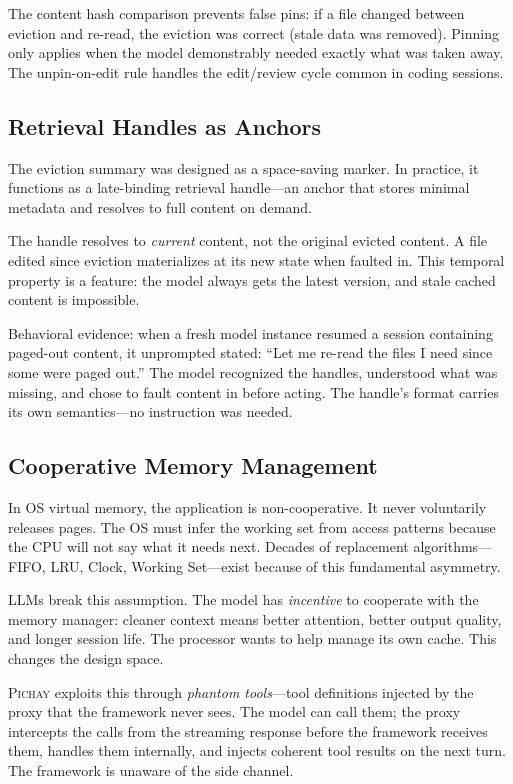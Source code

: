The content hash comparison prevents false pins: if a file changed
between eviction and re-read, the eviction was correct (stale data
was removed). Pinning only applies when the model demonstrably
needed exactly what was taken away. The unpin-on-edit rule handles
the edit/review cycle common in coding sessions.

\subsection{Retrieval Handles as Anchors}

The eviction summary was designed as a space-saving marker. In
practice, it functions as a late-binding retrieval handle---an anchor
that stores minimal metadata and resolves to full content on demand.

The handle resolves to \emph{current} content, not the original
evicted content. A file edited since eviction materializes at its
new state when faulted in. This temporal property is a feature: the
model always gets the latest version, and stale cached content is
impossible.

Behavioral evidence: when a fresh model instance resumed a session
containing paged-out content, it unprompted stated: ``Let me re-read
the files I need since some were paged out.'' The model recognized
the handles, understood what was missing, and chose to fault content
in before acting. The handle's format carries its own semantics---no
instruction was needed.

\subsection{Cooperative Memory Management}
\label{sec:cooperative}

In OS virtual memory, the application is non-cooperative. It never
voluntarily releases pages. The OS must infer the working set from
access patterns because the CPU will not say what it needs next.
Decades of replacement algorithms---FIFO, LRU, Clock, Working
Set---exist because of this fundamental asymmetry.

LLMs break this assumption. The model has \emph{incentive} to
cooperate with the memory manager: cleaner context means better
attention, better output quality, and longer session life. The
processor wants to help manage its own cache. This changes the
design space.

\textsc{Pichay} exploits this through \emph{phantom tools}---tool
definitions injected by the proxy that the framework never sees.
The model can call them; the proxy intercepts the calls from the
streaming response before the framework receives them, handles
them internally, and injects coherent tool results on the next
turn. The framework is unaware of the side channel.

